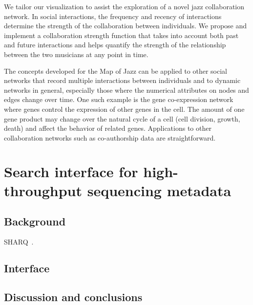 \documentclass[12pt]{cmuthesis}
\begin{document}
  We tailor our visualization to assist the exploration of a novel jazz
  collaboration network. In social interactions, the frequency and recency of
  interactions determine the strength of the collaboration between individuals.
  We propose and implement a collaboration strength function that takes into account both
  past and future interactions and helps quantify the strength of the
  relationship between the two musicians at any point in time.

  The concepts developed for the Map of Jazz can be applied to other social
  networks that record multiple interactions between individuals and to dynamic
  networks in general, especially those where the numerical attributes on nodes
  and edges change over time. One such example is the gene co-expression network
  where genes control the expression of other genes in the
  cell. The amount of one gene product may change over the natural cycle of a cell
  (cell division, growth, death) and affect the behavior of related genes.
  Applications to other collaboration networks such as co-authorship data are
  straightforward.



\chapter{Search interface for high-throughput sequencing metadata}

\section{Background}

SHARQ~\cite{SHARQwebsite}.

\section{Interface}

\section{Discussion and conclusions}


\end{document}
